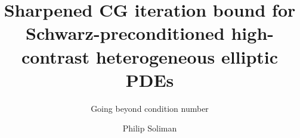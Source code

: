 \documentclass{../tudelft-report}
\begin{document}
\renewcommand{\onlyinsubfile}[1]{}
\renewcommand{\notinsubfile}[1]{#1}

\frontmatter
\title{Sharpened CG iteration bound for Schwarz-preconditioned high-contrast heterogeneous elliptic PDEs}
\subtitle{Going beyond condition number}
\author{Philip Soliman}
\subject{WI5005: Thesis Project} %
\makecover



\tableofcontents

\mainmatter
\newpage

\newpage

\newpage
\nochapterimage
\printbibliography

\appendix
\end{document}

